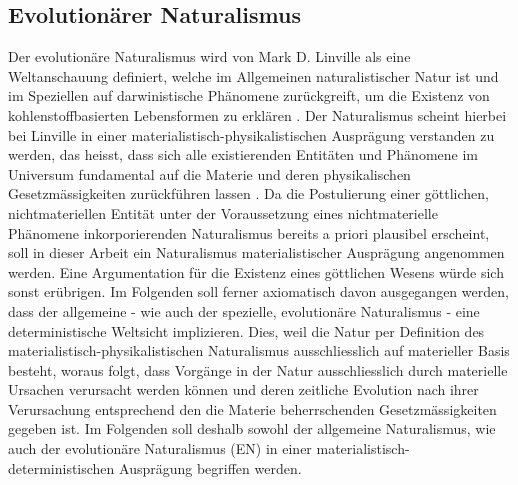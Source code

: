 \documentclass[a4paper,11pt]{article}
\numberwithin{equation}{section}
\begin{document}
\subsection{Evolutionärer Naturalismus}\label{defevnat}
Der evolutionäre Naturalismus wird von Mark D. Linville als eine Weltanschauung definiert, welche im Allgemeinen naturalistischer Natur ist und im Speziellen auf darwinistische Phänomene zurückgreift, um die Existenz von kohlenstoffbasierten Lebensformen zu erklären \cite[S. 394]{Linville2009-LINTMA-2}. Der Naturalismus scheint hierbei bei Linville in einer materialistisch-physikalistischen Ausprägung verstanden zu werden, das heisst, dass sich alle existierenden Entitäten und Phänomene im Universum fundamental auf die Materie und deren physikalischen Gesetzmässigkeiten zurückführen lassen \cite[S. 393]{Linville2009-LINTMA-2}. Da die Postulierung einer göttlichen, nichtmateriellen Entität unter der Voraussetzung eines nichtmaterielle Phänomene inkorporierenden Naturalismus bereits a priori plausibel erscheint, soll in dieser Arbeit ein Naturalismus materialistischer Ausprägung angenommen werden. Eine Argumentation für die Existenz eines göttlichen Wesens würde sich sonst erübrigen. Im Folgenden soll ferner axiomatisch davon ausgegangen werden, dass der allgemeine - wie auch der spezielle, evolutionäre Naturalismus - eine deterministische Weltsicht implizieren. Dies, weil die Natur per Definition des materialistisch-physikalistischen Naturalismus ausschliesslich auf materieller Basis besteht, woraus folgt, dass Vorgänge in der Natur ausschliesslich durch materielle Ursachen verursacht werden können und deren zeitliche Evolution nach ihrer Verursachung entsprechend den die Materie beherrschenden Gesetzmässigkeiten gegeben ist. Im Folgenden soll deshalb sowohl der allgemeine Naturalismus, wie auch der evolutionäre Naturalismus (EN) in einer materialistisch-deterministischen Ausprägung begriffen werden.
\end{document}
